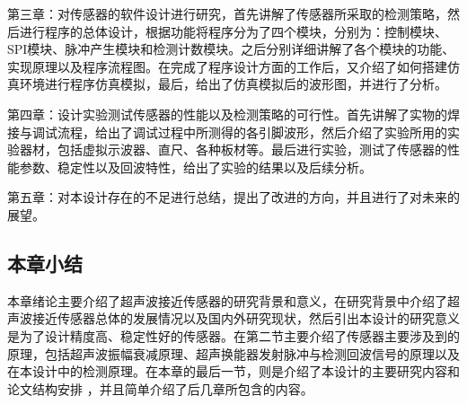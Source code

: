 第三章：对传感器的软件设计进行研究，首先讲解了传感器所采取的检测策略，然后进行程序的总体设计，根据功能将程序分为了四个模块，分别为：控制模块、SPI模块、脉冲产生模块和检测计数模块。之后分别详细讲解了各个模块的功能、实现原理以及程序流程图。在完成了程序设计方面的工作后，又介绍了如何搭建仿真环境进行程序仿真模拟，最后，给出了仿真模拟后的波形图，并进行了分析。


第四章：设计实验测试传感器的性能以及检测策略的可行性。首先讲解了实物的焊接与调试流程，给出了调试过程中所测得的各引脚波形，然后介绍了实验所用的实验器材，包括虚拟示波器、直尺、各种板材等。最后进行实验，测试了传感器的性能参数、稳定性以及回波特性，给出了实验的结果以及后续分析。


第五章：对本设计存在的不足进行总结，提出了改进的方向，并且进行了对未来的展望。


    \subsection{本章小结}
    本章绪论主要介绍了超声波接近传感器的研究背景和意义，在研究背景中介绍了超声波接近传感器总体的发展情况以及国内外研究现状，然后引出本设计的研究意义是为了设计精度高、稳定性好的传感器。在第二节主要介绍了传感器主要涉及到的原理，包括超声波振幅衰减原理、超声换能器发射脉冲与检测回波信号的原理以及在本设计中的检测原理。在本章的最后一节，则是介绍了本设计的主要研究内容和论文结构安排
    ，并且简单介绍了后几章所包含的内容。